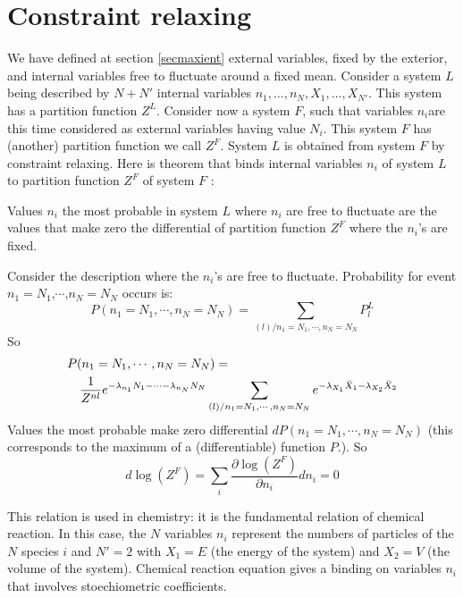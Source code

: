 \documentclass[12pt]{book}
\begin{document}
\section{Constraint relaxing}\label{secrelacont}
We have defined at section \ref{secmaxient} external variables, fixed by the
exterior, and internal variables free to fluctuate around a fixed mean.
Consider a system  $L$ being described by $N+N'$ internal variables
 $n_1,\dots,n_N,X_1,\dots,X_{N'}$. 
This system has a partition function $Z^{L}$. Consider now a system $F$, such
that variables $n_i$are this time considered as external variables having
value $N_i$. This system $F$ has (another) partition function we call
$Z^{F}$. System $L$ is obtained from system $F$ by constraint
relaxing. Here is theorem that binds internal variables $n_i$ 
of system  $L$ to partition function $Z^F$ of system $F$ :
\begin{thm}
Values $n_i$ the most probable in system $L$ where
$n_i$ are free to fluctuate are the values that make zero the differential of
partition function $Z^{F}$  where the $n_i$'s are fixed. 
\end{thm}
\begin{pf}
Consider the description where the $n_i$'s are free to fluctuate. Probability
for event $n_1=N_1$,$\cdots$,$n_N=N_N$ occurs is:
\begin{equation}
P(n_1=N_1,\cdots,n_N=N_N)=\sum_{(l)/n_1=N_1,\cdots,n_N=N_N}P^{L}_l
\end{equation}
So
\begin{eqnarray}
\lefteqn{P(n_1=N_1,\cdots,n_N=N_N) = }\\
&&\frac{1}{Z^{nl}} e^
{-\lambda_{n_1}N_1-\cdots-\lambda_{n_N}N_N} \sum_{(l)/n_1 =
N_1,\cdots,n_N=N_N} e^ {-\lambda_{X_1}\bar X_1-\lambda_{X_2}\bar X_2} 
\end{eqnarray}
Values the most probable make zero differential
$dP(n_1=N_1,\cdots,n_N=N_N)$ (this corresponds to the maximum of a
(differentiable) function $P$.).
So
\begin{equation}
d\log(Z^{F})=\sum_i \frac{\partial \log(Z^{F})}{\partial n_i}dn_i=0
\end{equation}
\end{pf}
\begin{rem}
This relation is used in chemistry: it is the fundamental relation of chemical
reaction. In this case, the $N$ variables
$n_i$ represent the numbers of particles of the $N$ species  $i$ and $N'=2$
with $X_1=E$ (the energy of the system)  and $X_2=V$ (the volume of the
system). Chemical reaction equation gives a binding on variables
$n_i$ that involves stoechiometric coefficients.
\end{rem}
\end{document}

